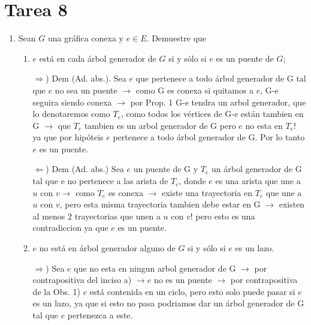 \documentclass{article}
\begin{document}
\section*{\LARGE{Tarea 8}}
\begin{enumerate}
\item Sean $G$ una gr\'afica conexa y $e \in E$.   Demuestre que
  \begin{enumerate}

    Proposiciones a usar 

    Prop. 1) Corolario 2.2.3 Si G es una gráfica conexa, entonces G contiene un árbol  generador (Demostración en la notas pagina 32).
    
    Obs. 1) Por definicion podemos concluir que una arista es un puente sii no esta contenida en ningun ciclo.

  \item $e$ est\'a en cada \'arbol generador de $G$ si y s\'olo si $e$ es un puente
    de $G$;

    $\Longrightarrow$) Dem (Ad. abs.). Sea $e$ que pertenece a todo árbol generador de G tal que $e$ no sea un puente $\rightarrow$ como G es conexa si quitamos a $e$, G-e seguira siendo conexa $\rightarrow$ por Prop. 1 G-e tendra un arbol generador, que lo denotaremos como $T_e$, como todos los vértices de G-e están tambien en G $\rightarrow$ que $T_e$ tambien  es un arbol generador de G pero $e$ no esta en $T_e$! ya que por hipóteis $e$ pertenece a todo árbol generador de G. Por lo tanto $e$ es un puente.
     
     
    $\Longleftarrow$) Dem (Ad. abs.) Sea $e$ un puente de G y $T_e$ un árbol generador de G tal que e no pertenece a las arista de $T_e$, donde $e$ es una arista que une a $u$ con  $v \rightarrow$ como $T_e$ es conexa $\rightarrow$ existe una trayectoria en $T_e$ que une a $u$ con  $v$, pero esta misma trayectoria tambien debe estar en G $\rightarrow$ existen al menos 2 trayectorias que unen a $u$ con  $v$! pero esto es una contradiccion ya que $e$ es un puente.

  \item $e$ no est\'a en \'arbol generador alguno de $G$ si y s\'olo si $e$ es un lazo.
  
  $\Longrightarrow$) Sea $e$ que no esta en ningun arbol generador de G $ \rightarrow$ por contrapositiva del inciso a) $ \rightarrow e$ no es un puente $ \rightarrow$ por contrapositiva de la Obs. 1) $e$ está contenida en un ciclo, pero esto solo puede pasar si $e$ es un lazo, ya que si esto no pasa podriamos dar un árbol generador de G tal que $e$ pertenezca a este. 
     

\end{enumerate}
\end{enumerate}
\end{document}
